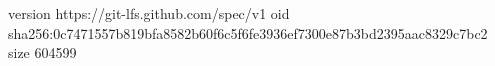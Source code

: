 version https://git-lfs.github.com/spec/v1
oid sha256:0c7471557b819bfa8582b60f6c5f6fe3936ef7300e87b3bd2395aac8329c7bc2
size 604599
